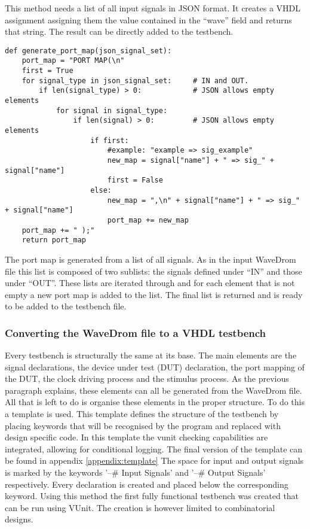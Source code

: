 This method needs a list of all input signals in JSON format. It creates a VHDL assignment assigning them the value contained in the “wave” field and returns that string. The result can be directly added to the testbench.\newpage
\begin{lstlisting}[style=python, caption={Generating a port map in Python}, label={
python:port_map}]
def generate_port_map(json_signal_set):
	port_map = "PORT MAP(\n"
	first = True
	for signal_type in json_signal_set:     # IN and OUT.
		if len(signal_type) > 0:            # JSON allows empty elements
			for signal in signal_type:
				if len(signal) > 0:         # JSON allows empty elements
					if first:
						#example: "example => sig_example"
						new_map = signal["name"] + " => sig_" + signal["name"]
						first = False
					else:
						new_map = ",\n" + signal["name"] + " => sig_" + signal["name"]
						port_map += new_map
	port_map += " );"
	return port_map
\end{lstlisting}\noindent
The port map is generated from a list of all signals. As in the input WaveDrom file this list is composed of two sublists: the signals defined under “IN” and those under “OUT”. These lists are iterated through and for each element that is not empty a new port map is added to the list. The final list is returned and is ready to be added to the testbench file.
\subsubsection{Converting the WaveDrom file to a VHDL testbench}
Every testbench is structurally the same at its base. The main elements are the signal declarations, the device under test (DUT) declaration, the port mapping of the DUT, the clock driving process and the stimulus process. As the previous paragraph explains, these elements can all be generated from the WaveDrom file. All that is left to do is organise these elements in the proper structure. To do this a template is used. This template defines the structure of the testbench by placing keywords that will be recognised by the program and replaced with design specific code. In this template the vunit checking capabilities are integrated, allowing for conditional logging. The final version of the template can be found in appendix \ref{appendix:template}
\npar
The space for input and output signals is marked by the keywords '--\# Input Signals' and '--\# Output Signals' respectively. Every declaration is created and placed below the corresponding keyword. 
\npar
Using this method the first fully functional testbench was created that can be run using VUnit. The creation is however limited to combinatorial designs.
